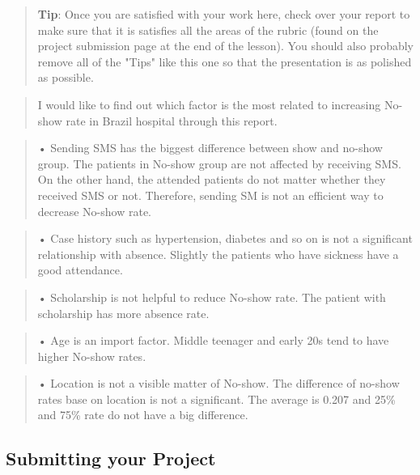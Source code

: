 \documentclass[11pt]{article}
\begin{document}
\begin{quote}
\textbf{Tip}: Once you are satisfied with your work here, check over
your report to make sure that it is satisfies all the areas of the
rubric (found on the project submission page at the end of the lesson).
You should also probably remove all of the "Tips" like this one so that
the presentation is as polished as possible.
\end{quote}

\begin{quote}
I would like to find out which factor is the most related to increasing
No-show rate in Brazil hospital through this report.
\end{quote}

\begin{quote}
• Sending SMS has the biggest difference between show and no-show group.
The patients in No-show group are not affected by receiving SMS. On the
other hand, the attended patients do not matter whether they received
SMS or not. Therefore, sending SM is not an efficient way to decrease
No-show rate.
\end{quote}

\begin{quote}
• Case history such as hypertension, diabetes and so on is not a
significant relationship with absence. Slightly the patients who have
sickness have a good attendance.
\end{quote}

\begin{quote}
• Scholarship is not helpful to reduce No-show rate. The patient with
scholarship has more absence rate.
\end{quote}

\begin{quote}
• Age is an import factor. Middle teenager and early 20s tend to have
higher No-show rates.
\end{quote}

\begin{quote}
• Location is not a visible matter of No-show. The difference of no-show
rates base on location is not a significant. The average is 0.207 and
25\% and 75\% rate do not have a big difference.
\end{quote}

    \subsection{Submitting your Project}\label{submitting-your-project}
\end{document}
